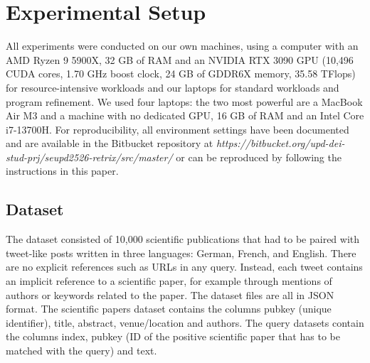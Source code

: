 \section{Experimental Setup}
\label{sec:setup}
All experiments were conducted on our own machines, using a computer with an AMD Ryzen 9 5900X, 32 GB of RAM and an NVIDIA RTX 3090 GPU (10,496 CUDA cores, 1.70 GHz boost clock, 24 GB of GDDR6X memory, 35.58 TFlops) for resource-intensive workloads and our laptops for standard workloads and program refinement. We used four laptops: the two most powerful are a MacBook Air M3 and a machine with no dedicated GPU, 16 GB of RAM and an Intel Core i7-13700H.
For reproducibility, all environment settings have been documented and are available in the Bitbucket repository at \textit{https://bitbucket.org/upd-dei-stud-prj/seupd2526-retrix/src/master/} or can be reproduced by following the instructions in this paper.

\subsection{Dataset}
\label{sec:dataset}

The dataset consisted of 10,000 scientific publications that had to be paired with tweet-like posts written in three languages: German, French, and English. There are no explicit references such as URLs in any query. Instead, each tweet contains an implicit reference to a scientific paper, for example through mentions of authors or keywords related to the paper. The dataset files are all in JSON format. The scientific papers dataset contains the columns pubkey (unique identifier), title, abstract, venue/location and authors. The query datasets contain the columns index, pubkey (ID of the positive scientific paper that has to be matched with the query) and text.


